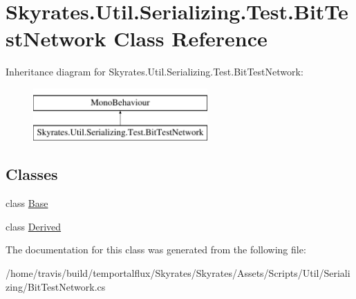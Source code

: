 \hypertarget{class_skyrates_1_1_util_1_1_serializing_1_1_test_1_1_bit_test_network}{\section{Skyrates.\-Util.\-Serializing.\-Test.\-Bit\-Test\-Network Class Reference}
\label{class_skyrates_1_1_util_1_1_serializing_1_1_test_1_1_bit_test_network}
}
Inheritance diagram for Skyrates.\-Util.\-Serializing.\-Test.\-Bit\-Test\-Network\-:\begin{figure}[H]
\begin{center}
\leavevmode
\includegraphics[height=2.000000cm]{class_skyrates_1_1_util_1_1_serializing_1_1_test_1_1_bit_test_network}
\end{center}
\end{figure}
\subsection*{Classes}
\begin{DoxyCompactItemize}
\item 
class \hyperlink{class_skyrates_1_1_util_1_1_serializing_1_1_test_1_1_bit_test_network_1_1_base}{Base}
\item 
class \hyperlink{class_skyrates_1_1_util_1_1_serializing_1_1_test_1_1_bit_test_network_1_1_derived}{Derived}
\end{DoxyCompactItemize}


The documentation for this class was generated from the following file\-:\begin{DoxyCompactItemize}
\item 
/home/travis/build/temportalflux/\-Skyrates/\-Skyrates/\-Assets/\-Scripts/\-Util/\-Serializing/Bit\-Test\-Network.\-cs\end{DoxyCompactItemize}
